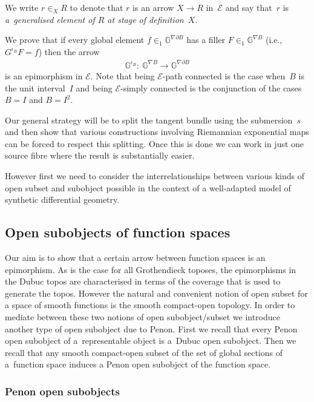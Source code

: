 \documentclass[10pt,a4paper]{amsart}
\numberwithin{equation}{section}
\begin{document}
\begin{Notation} We write $r\in_{X}R$ to denote that $r$ is an arrow $X\rightarrow R$ in~$\mathcal{E}$ and say that~$r$ is \emph{a~generalised element of $R$ at stage of definition~$X$}.
\end{Notation}

We prove that if every global element $f\in_1 \mathbb{G}^{\nabla\partial B}$ has a f\/iller $F\in_1 \mathbb{G}^{\nabla B}$ (i.e., $G^{\iota_B}F=f$) then the arrow
\begin{gather*}\mathbb{G}^{\iota_B}\colon \ \mathbb{G}^{\nabla B} \rightarrow \mathbb{G}^{\nabla\partial B}\end{gather*}
is an epimorphism in $\mathcal{E}$. Note that being $\mathcal{E}$-path connected is the case when~$B$ is the unit interval~$I$ and being $\mathcal{E}$-simply connected is the conjunction of the cases $B=I$ and $B=I^2$.

Our general strategy will be to split the tangent bundle using the submersion~$s$ and then show that various constructions involving Riemannian exponential maps can be forced to respect this splitting. Once this is done we can work in just one source f\/ibre where the result is substantially easier.

However f\/irst we need to consider the interrelationships between various kinds of open subset and subobject possible in the context of a well-adapted model of synthetic dif\/ferential geometry.

\subsection{Open subobjects of function spaces}

Our aim is to show that a certain arrow between function spaces is an epimorphism. As is the case for all Grothendieck toposes, the epimorphisms in the Dubuc topos are characterised in terms of the coverage that is used to generate the topos. However the natural and convenient notion of open subset for a space of smooth functions is the smooth compact-open topology. In order to mediate between these two notions of open subobject/subset we introduce another type of open subobject due to Penon. First we recall that every Penon open subobject of a~representable object is a~Dubuc open subobject. Then we recall that any smooth compact-open subset of the set of global sections of a~function space induces a Penon open subobject of the function space.

\subsubsection{Penon open subobjects}
\end{document}
